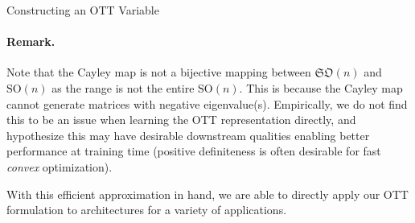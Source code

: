 \begin{algorithm}
	\caption{ \label{alg:ott-core} Constructing an OTT Variable}
	\SetAlgoLined
	\DontPrintSemicolon
\end{algorithm}

\paragraph{Remark.} Note that the Cayley map is not a bijective mapping between $\mathfrak{SO}(n)$ and $\text{SO}(n)$ as the range is not the entire $\text{SO}(n)$. This is because the Cayley map cannot generate matrices with negative eigenvalue(s). Empirically, we do not find this to be an issue when learning the OTT representation directly, and hypothesize this may have desirable downstream qualities enabling better performance at training time (positive definiteness is often desirable for fast \textit{convex} optimization).

With this efficient approximation in hand, we are able to directly apply our OTT formulation to architectures for a variety of applications.